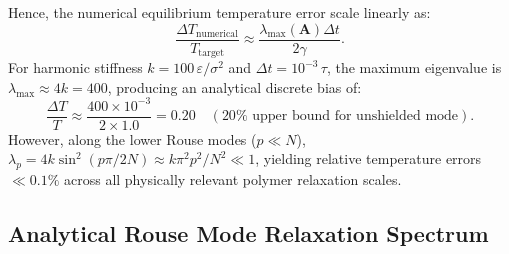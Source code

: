 \documentclass[12pt,a4paper]{article}
\begin{document}
Hence, the numerical equilibrium temperature error scale linearly as:
\begin{equation}
  \frac{\Delta T_\text{numerical}}{T_\text{target}} \approx \frac{\lambda_\text{max}(\mathbf{A}) \Delta t}{2 \gamma}.
\end{equation}
For harmonic stiffness $k = 100\,\varepsilon/\sigma^2$ and $\Delta t = 10^{-3}\,\tau$, the maximum eigenvalue is $\lambda_\text{max} \approx 4k = 400$, producing an analytical discrete bias of:
\begin{equation}
  \frac{\Delta T}{T} \approx \frac{400 \times 10^{-3}}{2 \times 1.0} = 0.20 \quad (20\% \text{ upper bound for unshielded mode}).
\end{equation}
However, along the lower Rouse modes ($p \ll N$), $\lambda_p = 4k \sin^2(p\pi/2N) \approx k \pi^2 p^2 / N^2 \ll 1$, yielding relative temperature errors $\ll 0.1\%$ across all physically relevant polymer relaxation scales.

\subsection{Analytical Rouse Mode Relaxation Spectrum}
\label{app:rouse-derivation}
\end{document}
